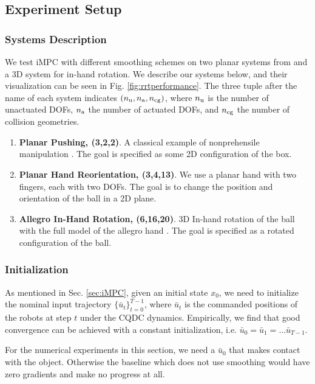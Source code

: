 \subsection{Experiment Setup}\label{sec:trajopt_setup}
\subsubsection{Systems Description \label{sec:trajopt_setup:systems}}
We test iMPC with different smoothing schemes on two planar systems from \cite{bundledgradients} and a 3D system for in-hand rotation. We describe our systems below, and their visualization can be seen in Fig. \ref{fig:rrtperformance}. The three tuple after the name of each system indicates $(n_\mathrm{u}, n_\mathrm{a}, n_\mathrm{cg})$, where $n_\mathrm{u}$ is the number of unactuated DOFs, $n_\mathrm{a}$ the number of actuated DOFs, and $n_\mathrm{cg}$ the number of collision geometries.

\begin{enumerate}
\item {\bf Planar Pushing, (3,2,2)}.  A classical example of nonprehensile manipulation \cite{lynch1996stable}. The goal is specified as some 2D configuration of the box.
\item {\bf Planar Hand Reorientation, (3,4,13)}.  We use a planar hand with two fingers, each with two DOFs. The goal is to change the position and orientation of the ball in a 2D plane.
\item {\bf Allegro In-Hand Rotation, (6,16,20)}.  3D In-hand rotation of the ball with the full model of the allegro hand \cite{huang2020efficient}. The goal is specified as a rotated configuration of the ball.
\end{enumerate}

\subsubsection{Initialization}
As mentioned in Sec. \ref{sec:iMPC}, given an initial state $x_0$, we need to initialize the nominal input trajectory $\{\bar{u}_t\}^{T-1}_{t=0}$, where $\bar{u}_t$ is the commanded positions of the robots at step $t$ under the CQDC dynamics. Empirically, we find that good convergence can be achieved with a constant initialization, i.e. $\bar{u}_0 = \bar{u}_1 = \dots \bar{u}_{T-1}$. 

For the numerical experiments in this section, we need a $\bar{u}_0$ that makes contact with the object. Otherwise the baseline which does not use smoothing would have zero gradients and make no progress at all. 

